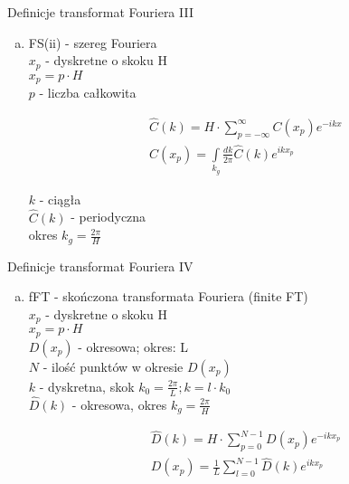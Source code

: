 \begin{frame}{Definicje transformat Fouriera III}
	\begin{enumerate}[c)]
		\item FS(ii) - szereg Fouriera \\
		$x_p$ - dyskretne o skoku H \\
		$x_p = p \cdot H$ \\
		$p$ - liczba całkowita
		\begin{block}
		\centering
		\renewcommand{\arraystretch}{1.5}
		\setlength{\abovedisplayskip}{0pt}
		\setlength{\belowdisplayskip}{0pt}
		\setlength{\abovedisplayshortskip}{0pt}
		\setlength{\belowdisplayshortskip}{0pt}
		\[
			\begin{array}{c}
			\widehat{C}(k) = H \cdot \sum\limits_{p = -\infty}^{\infty} C(x_p) e^{-ikx} \\
			C(x_p) = \int\limits_{k_g} \frac{dk}{2 \pi} \widehat{C}(k) e^{ikx_p}
			\end{array}
			\tag{16.3}
		\]
		\end{block}
		$k$ - ciągła \\
		$\widehat{C}(k)$ - periodyczna \\
		okres $k_g = \frac{2 \pi}{H}$
	\end{enumerate}
\end{frame}
\begin{frame}{Definicje transformat Fouriera IV}
	\begin{enumerate}[d)]
		\item fFT - skończona transformata Fouriera (finite FT) \\
		$x_p$ - dyskretne o skoku H \\
		$x_p = p \cdot H$ \\
		$D(x_p)$ - okresowa; okres: L \\
		$N$ - ilość punktów w okresie $D(x_p)$ \\
		$k$ - dyskretna, skok $k_0 = \frac{2 \pi}{L}; k = l \cdot k_0$ \\
		$\widehat{D}(k)$ - okresowa, okres $k_g = \frac{2 \pi}{H}$
		\begin{block}
		\centering
		\renewcommand{\arraystretch}{1.5}
		\setlength{\abovedisplayskip}{0pt}
		\setlength{\belowdisplayskip}{0pt}
		\setlength{\abovedisplayshortskip}{0pt}
		\setlength{\belowdisplayshortskip}{0pt}
		\[
			\begin{array}{c}
			\widehat{D}(k) = H \cdot \sum\limits_{p = 0}^{N-1} D(x_p) e^{-ikx_p} \\
			D(x_p) = \frac{1}{L} \sum\limits_{l = 0}^{N-1} \widehat{D}(k) e^{ikx_p}
				\end{array}
			\tag{16.4}
		\]
		\end{block}
	\end{enumerate}
\end{frame}

